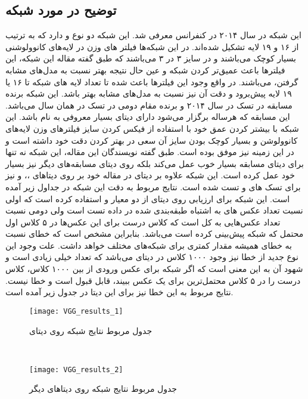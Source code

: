 \documentclass{article}
\begin{document}
\subsection{توضیح در مورد شبکه }
این شبکه در سال ۲۰۱۴ در کنفرانس  معرفی شد. این شبکه دو نوع  و  دارد که به ترتیب از ۱۶ و ۱۹ لایه تشکیل شده‌اند. در این شبکه‌ها فیلتر های وزن در لایه‌های کانوولوشنی بسیار کوچک می‌باشند و در سایز ۳ در ۳ می‌باشند که طبق گفته مقاله این شبکه، این فیلتر‌ها باعث عمیق‌تر کردن شبکه و عین حال نتیجه بهتر نسبت به مدل‌های مشابه گرفتن‌، می‌باشند. در واقع وجود این فیلتر‌ها باعث شده تا تعداد لایه ‌های شبکه تا ۱۶ یا ۱۹ لایه پیش‌برود و دقت آن نیز نسبت به مدل‌های مشابه بهتر باشد. این شبکه  برنده مسابقه  در تسک  در سال ۲۰۱۴ و برنده مقام دومی در تسک  در همان سال می‌باشد. این مسابقه که هرساله برگزار می‌شود دارای دیتای بسیار معروفی به نام  باشد. این شبکه با بیشتر کردن عمق‌ خود با استفاده از فیکس کردن سایز فیلتر‌های وزن لایه‌های کانوولوشن و بسیار کوچک بودن سایز آن سعی در بهتر کردن دقت خود داشته است و در این زمینه نیز موفق بوده است. طبق گفته نویسندگان این مقاله، این شبکه نه تنها برای دیتای مسابقه  بسیار خوب عمل می‌کند بلکه روی دیتای مسابقه‌های دیگر نیز بسیار خود عمل کرده است. این شبکه علاوه بر دیتای  در مقاله‌ خود بر روی دیتاهای ،،  و  نیز برای تسک های  و  تست شده است.  نتایج مربوط به دقت این شبکه در جداول زیر آمده است. این شبکه برای ارزیابی روی دیتای  از دو معیار  و  استفاده کرده است که اولی نسبت تعداد عکس های به اشتباه طبقه‌بندی شده در داده تست است ولی دومی نسبت تعداد عکس‌هایی به کل است که کلاس درست برای این عکس‌ها در ۵ کلاس اول محتمل که شبکه پیش‌بینی کرده است می‌باشد. بنابراین مشخص است که خطای  نسبت به خطای  همیشه مقدار کمتری برای شبکه‌های مختلف خواهد داشت. علت وجود این نوع جدید از خطا نیز وجود ۱۰۰۰ کلاس در دیتای  می‌باشد که تعداد خیلی زیادی است و شهود آن به این معنی است که اگر شبکه برای عکس ورودی از بین ۱۰۰۰ کلاس، کلاس درست را در ۵ کلاس محتمل‌ترین برای یک عکس ببیند، قابل قبول است و خطا نیست. نتایج مربوط به این خطا نیز برای این دیتا در جدول زیر آمده است.
‌\begin{figure}[H]
	\centerline{\texttt{[image: VGG\_results\_1]}}
	\caption{جدول مربوط نتایج شبکه  روی دیتای }
\end{figure}

‌\begin{figure}[H]
	\centerline{\texttt{[image: VGG\_results\_2]}}
	\caption{جدول مربوط نتایج شبکه  روی دیتاهای دیگر}
\end{figure}
\end{document}
